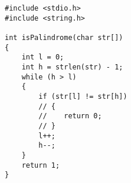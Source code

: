 
\begin{lstlisting}[style=CStyle, caption=Mutant M2 of function isPalindrome., label=isPalindrome_m2]
#include <stdio.h> 
#include <string.h> 

int isPalindrome(char str[]) 
{ 
    int l = 0; 
    int h = strlen(str) - 1; 
    while (h > l) 
    { 
        if (str[l] != str[h]) 
        // { 
        //    return 0;
        // } 
        l++;
        h--;
    } 
    return 1; 
} 
\end{lstlisting}